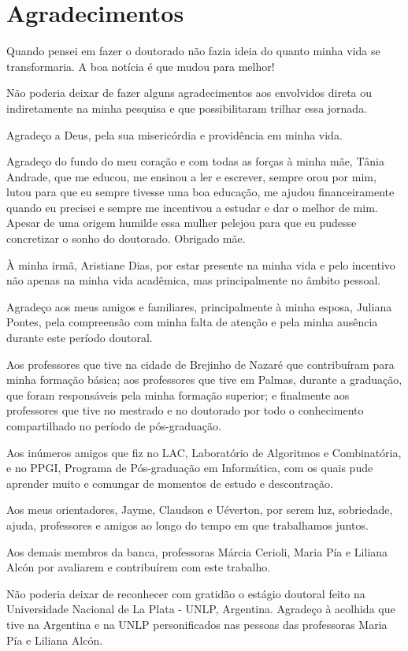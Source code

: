 \chapter*{Agradecimentos}

Quando pensei em fazer o doutorado não fazia ideia do quanto minha vida se transformaria. A boa notícia é que mudou para melhor!

Não poderia deixar de fazer alguns agradecimentos aos envolvidos direta ou indiretamente na minha pesquisa e que possibilitaram trilhar essa jornada. 

Agradeço a Deus, pela sua misericórdia e providência em minha vida.

Agradeço do fundo do meu coração e com todas as forças à minha mãe, Tânia Andrade, que me educou, me ensinou a ler e escrever, sempre orou por mim, lutou para que eu sempre tivesse uma boa educação, me ajudou financeiramente quando eu precisei e sempre me incentivou a estudar e dar o melhor de mim. Apesar de uma origem humilde essa mulher pelejou para que eu pudesse concretizar o sonho do doutorado. Obrigado mãe.

À minha irmã, Aristiane Dias, por estar presente na minha vida e pelo incentivo não apenas na minha vida acadêmica, mas principalmente no âmbito pessoal.

Agradeço aos meus amigos e familiares, principalmente à minha esposa, Juliana Pontes, pela compreensão com minha falta de atenção e pela minha ausência durante este período doutoral.

Aos professores que tive na cidade de Brejinho de Nazaré que contribuíram para minha formação básica; aos professores que tive em Palmas, durante a graduação, que foram responsáveis pela minha formação superior; e finalmente aos professores que tive no mestrado e no doutorado por todo o conhecimento compartilhado no período de pós-graduação.

Aos inúmeros amigos que fiz no LAC, Laboratório de Algoritmos e Combinatória, e no PPGI, Programa de Pós-graduação em Informática, com os quais pude aprender muito e comungar de momentos de estudo e descontração.

Aos meus orientadores, Jayme, Claudson e Uéverton, por serem luz, sobriedade, ajuda, professores e amigos ao longo do tempo em que trabalhamos juntos.

Aos demais membros da banca, professoras Márcia Cerioli, Maria Pía e Liliana Alcón por avaliarem e contribuírem com este trabalho.

Não poderia deixar de reconhecer com gratidão o estágio doutoral feito na Universidade Nacional de La Plata - UNLP, Argentina. Agradeço à acolhida que tive na Argentina e na UNLP personificados nas pessoas das professoras Maria Pía e Liliana Alcón.


